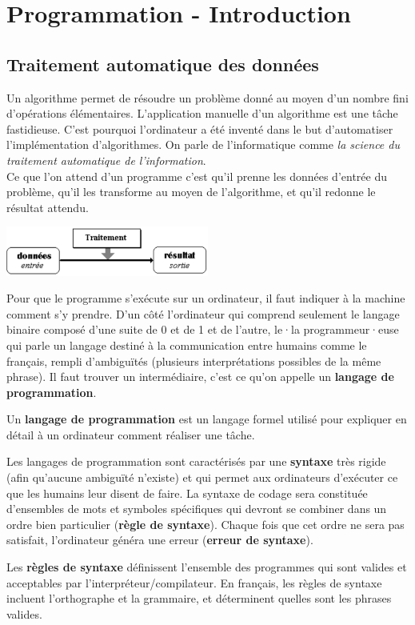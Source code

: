 \documentclass[11pt, a4paper]{book}
\begin{document}
\setcounter{chapter}{5}

\chapter{Programmation - Introduction}

\section{Traitement automatique des données} 
Un algorithme permet de résoudre un problème donné au moyen d'un nombre fini d'opérations élémentaires. L'application manuelle d'un algorithme est une tâche fastidieuse. C'est pourquoi l'ordinateur a été inventé dans le but d'automatiser l'implémentation d'algorithmes. On parle de l'informatique comme \textit{la science du traitement automatique de l'information}.\\

Ce  que l'on attend d'un programme c'est qu'il prenne les données d'entrée du problème, qu'il les transforme au moyen de l'algorithme, et qu'il redonne le résultat attendu.
\begin{center}
	\includegraphics[trim=0 0 0 20,width=0.5\textwidth]{images/shema_science_info}
\end{center}
Pour que le programme s'exécute sur un ordinateur, il faut indiquer à la machine comment s'y prendre. 
D'un côté l'ordinateur qui comprend seulement le langage binaire composé d'une suite de 0 et de 1 et de l'autre, le·la programmeur·euse qui parle un langage destiné à la communication entre humains comme le français, rempli d'ambiguïtés (plusieurs interprétations possibles de la même phrase). Il faut trouver un intermédiaire, c'est ce qu'on appelle un \textbf{langage de programmation}. 
\begin{defi}
	Un \textbf{langage de programmation} est un langage formel utilisé pour expliquer en détail à un ordinateur comment réaliser une tâche.
\end{defi}
Les langages de programmation sont caractérisés par une \textbf{syntaxe} très rigide (afin qu'aucune ambiguïté n'existe) et qui permet aux ordinateurs d'exécuter ce que les humains leur disent de faire. La syntaxe de codage sera constituée d'ensembles de mots et symboles spécifiques qui devront se combiner  dans un ordre bien particulier (\textbf{règle de syntaxe}). Chaque fois que cet ordre ne sera pas satisfait, l'ordinateur généra une erreur (\textbf{erreur de syntaxe}).
\begin{defi}
	Les \textbf{règles de syntaxe} définissent l’ensemble des programmes qui sont valides et acceptables par l’interpréteur/compilateur.
	En français, les règles de syntaxe incluent l’orthographe et la grammaire, et déterminent quelles sont les phrases valides.
\end{defi}
\end{document}
